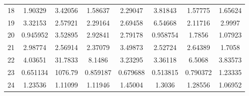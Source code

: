 \begin{center}
\begin{longtable}{cccccccc}
18 & 1.90329 & 3.42056 & 1.58637 & 2.29047 & 3.81843 & 1.57775 & 1.65624\\
19 & 3.32153 & 2.57921 & 2.29164 & 2.69458 & 6.54668 & 2.11716 & 2.9997\\
20 & 0.945952 & 3.52895 & 2.92841 & 2.79178 & 0.958754 & 1.7856 & 1.07923\\
21 & 2.98774 & 2.56914 & 2.37079 & 3.49873 & 2.52724 & 2.64389 & 1.7058\\
22 & 4.03651 & 31.7833 & 8.1486 & 3.23295 & 3.36118 & 6.5068 & 3.83573\\
23 & 0.651134 & 1076.79 & 0.859187 & 0.679688 & 0.513815 & 0.790372 & 1.23335\\
24 & 1.23536 & 1.11099 & 1.11946 & 1.45004 & 1.3036 & 1.28556 & 1.06952\\
\end{longtable}
\end{center} 


